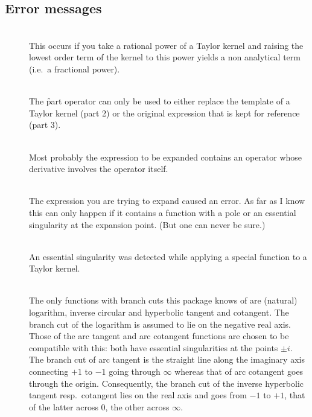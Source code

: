 \subsection{Error messages}
\begin{description}

\item[]\mbox{}\\
    This occurs if you take a rational power of a Taylor kernel
    and raising the lowest order term of the kernel to this
    power yields a non analytical term (i.e.\ a fractional power).

\item[]\mbox{}\\
%
    The \f{part} operator can only be used to either replace the
    template of a Taylor kernel (part 2) or the original expression
    that is kept for reference (part 3).    

\item[]\mbox{}\\
    Most probably the expression to be expanded contains an operator
    whose derivative involves the operator itself.

\item[]\mbox{}\\
    The expression you are trying to expand caused an error.
    As far as I know this can only happen if it contains a function
    with a pole or an essential singularity at the expansion point.
    (But one can never be sure.)

\item[]\mbox{}\\
    An essential singularity was detected while applying a
    special function to a Taylor kernel.

\item[]\mbox{}\\
    The only functions with branch cuts this package knows of are
    (natural) logarithm, inverse circular and hyperbolic tangent and
    cotangent.  The branch cut of the logarithm is assumed to lie on
    the negative real axis.  Those of the arc tangent and arc
    cotangent functions are chosen to be compatible with this: both
    have essential singularities at the points $\pm i$.  The branch
    cut of arc tangent is the straight line along the imaginary axis
    connecting $+1$ to $-1$ going through $\infty$ whereas that of arc
    cotangent goes through the origin.  Consequently, the branch cut
    of the inverse hyperbolic tangent resp.\ cotangent lies on the
    real axis and goes from $-1$ to $+1$, that of the latter across
    $0$, the other across $\infty$.


\end{description}
